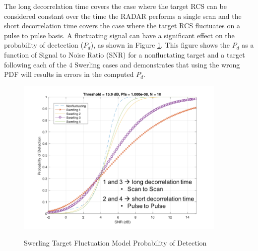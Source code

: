 The long decorrelation time covers the case where the target RCS can be considered constant over the time the RADAR performs a single scan and the short decorrelation time covers the case where the target RCS fluctuates on a pulse to pulse basis. A fluctuating signal can have a significant effect on the probability of dectection ($P_d$), as shown in Figure \ref{ms_fig:3}. This figure shows the $P_d$ as a function of Signal to Noise Ratio (SNR) for a nonfluctating target and a target following each of the $4$ Swerling cases and demonstrates that using the wrong PDF will results in errors in the computed $P_d$.
\begin{figure}[H]
  \begin{center}
\includegraphics[width=4in]{../media/multistatic/swerling_pd.png}
  \end{center}
  \renewcommand{\baselinestretch}{1} \small\normalsize
  \begin{quote}
    \caption[Swerling Target Fluctuation Model Probability of Detection]{Swerling Target Fluctuation Model Probability of Detection\label{ms_fig:3}}
  \end{quote}
\end{figure}
\renewcommand{\baselinestretch}{2} \small\normalsize